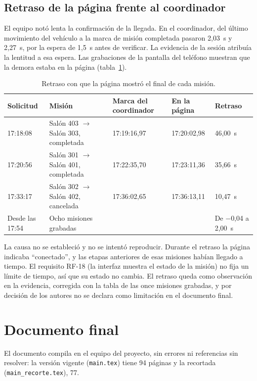 \documentclass[12pt,letterpaper]{article}
\begin{document}
\subsection{Retraso de la página frente al coordinador}
\label{sec:retraso}

El equipo notó lenta la confirmación de la llegada. En el coordinador, del último movimiento del vehículo a la marca de misión completada pasaron 2,03~s y 2,27~s, por la espera de 1,5~s antes de verificar. La evidencia de la sesión atribuía la lentitud a esa espera. Las grabaciones de la pantalla del teléfono muestran que la demora estaba en la página (tabla~\ref{tab:retraso}).

\begin{table}[H]
\centering
\small
\caption{Retraso con que la página mostró el final de cada misión.}
\label{tab:retraso}
\begin{tabular}{@{}p{2.1cm}p{5.6cm}p{2.4cm}p{2.4cm}p{2.3cm}@{}}
\toprule
\textbf{Solicitud} & \textbf{Misión} & \textbf{Marca del coordinador} & \textbf{En la página} & \textbf{Retraso} \\ \midrule
17:18:08 & Salón 403 $\rightarrow$ Salón 303, completada & 17:19:16,97 & 17:20:02,98 & 46,00~s \\
17:20:56 & Salón 301 $\rightarrow$ Salón 401, completada & 17:22:35,70 & 17:23:11,36 & 35,66~s \\
17:33:17 & Salón 302 $\rightarrow$ Salón 402, cancelada & 17:36:02,65 & 17:36:13,11 & 10,47~s \\
Desde las 17:54 & Ocho misiones grabadas & & & De $-$0,04 a 2,00~s \\ \bottomrule
\end{tabular}
\end{table}

La causa no se estableció y no se intentó reproducir. Durante el retraso la página indicaba ``conectado'', y las etapas anteriores de esas misiones habían llegado a tiempo. El requisito RF-18 (la interfaz muestra el estado de la misión) no fija un límite de tiempo, así que su estado no cambia. El retraso queda como observación en la evidencia, corregida con la tabla de las once misiones grabadas, y por decisión de los autores no se declara como limitación en el documento final.

\section{Documento final}
\label{sec:documento}

El documento compila en el equipo del proyecto, sin errores ni referencias sin resolver: la versión vigente (\texttt{main.tex}) tiene 94 páginas y la recortada (\texttt{main\_recorte.tex}), 77.
\end{document}
